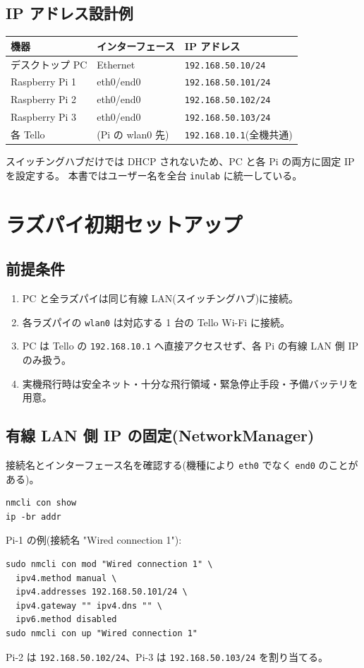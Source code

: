\documentclass[11pt,a4paper]{ltjsarticle}
\newcommand{\code}[1]{\texttt{\small #1}}
\begin{document}
\subsection{IP アドレス設計例}
\begin{longtable}{@{}p{4.4cm}p{3.6cm}p{6.2cm}@{}}
\toprule
\textbf{機器} & \textbf{インターフェース} & \textbf{IP アドレス} \\
\midrule
\endhead
デスクトップ PC & Ethernet & \code{192.168.50.10/24} \\
Raspberry Pi 1 & eth0/end0 & \code{192.168.50.101/24} \\
Raspberry Pi 2 & eth0/end0 & \code{192.168.50.102/24} \\
Raspberry Pi 3 & eth0/end0 & \code{192.168.50.103/24} \\
各 Tello & (Pi の wlan0 先) & \code{192.168.10.1}(全機共通) \\
\bottomrule
\end{longtable}
スイッチングハブだけでは DHCP されないため、PC と各 Pi の両方に固定 IP を設定する。
本書ではユーザー名を全台 \code{inulab} に統一している。

\section{ラズパイ初期セットアップ}

\subsection{前提条件}
\begin{enumerate}[leftmargin=1.6em]
  \item PC と全ラズパイは同じ有線 LAN(スイッチングハブ)に接続。
  \item 各ラズパイの \code{wlan0} は対応する 1 台の Tello Wi-Fi に接続。
  \item PC は Tello の \code{192.168.10.1} へ直接アクセスせず、各 Pi の有線 LAN 側 IP のみ扱う。
  \item 実機飛行時は安全ネット・十分な飛行領域・緊急停止手段・予備バッテリを用意。
\end{enumerate}

\subsection{有線 LAN 側 IP の固定(NetworkManager)}
接続名とインターフェース名を確認する(機種により \code{eth0} でなく \code{end0} のことがある)。
\begin{lstlisting}
nmcli con show
ip -br addr
\end{lstlisting}
Pi-1 の例(接続名 "Wired connection 1"):
\begin{lstlisting}
sudo nmcli con mod "Wired connection 1" \
  ipv4.method manual \
  ipv4.addresses 192.168.50.101/24 \
  ipv4.gateway "" ipv4.dns "" \
  ipv6.method disabled
sudo nmcli con up "Wired connection 1"
\end{lstlisting}
Pi-2 は \code{192.168.50.102/24}、Pi-3 は \code{192.168.50.103/24} を割り当てる。
\end{document}
